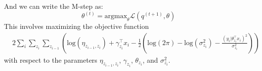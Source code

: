 \documentclass[12pt]{article}
\begin{document}
And we can write the M-step as:
\begin{equation}
    \theta^{(t)} = \text{argmax}_{\theta} \mathcal{L}(q^{(t+1)},\theta)
\end{equation}
This involves maximizing the objective function 
\begin{equation}
    \begin{split}
        & 2\sum_i \sum_{z_i} \sum_{z_{i-1}} \left( \text{log}(\eta_{z_{i-1},z_i}) + \gamma_{z_i}^{\top} x_i 
             -\frac{1}{2}\left( \text{log}(2\pi) - \text{log}(\sigma_{z_i}^2) - \frac{(y_i | \theta_{z_i}^{\top} x_i)^2}{ \sigma_{z_i}^2} \right)  \right)
    \end{split}
\end{equation}
with respect to the parameters $\eta_{z_{i-1},z_i}$, $\gamma_{z_i}$, $\theta_{z_i}$, and $\sigma_{z_i}^2$.
\end{document}
